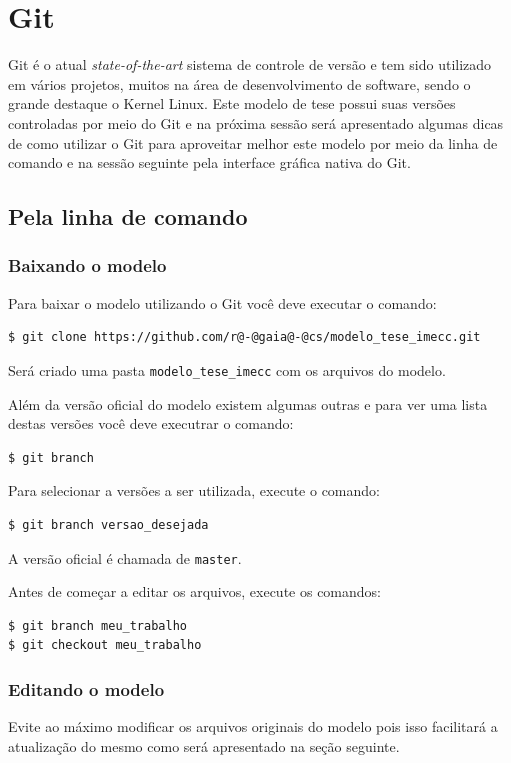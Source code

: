 \chapter{Git}
Git é o atual \textit{state-of-the-art} sistema de controle de versão e tem sido
utilizado em vários projetos, muitos na área de desenvolvimento de software,
sendo o grande destaque o Kernel Linux. Este modelo de tese possui suas versões
controladas por meio do Git e na próxima sessão será apresentado algumas
dicas de como utilizar o Git para aproveitar melhor este modelo por meio da
linha de comando e na sessão seguinte pela interface gráfica nativa do Git.

\section{Pela linha de comando}
\subsection{Baixando o modelo}
Para baixar o modelo utilizando o Git você deve executar o comando:
\begin{lstlisting}[escapechar=@]
$ git clone https://github.com/r@-@gaia@-@cs/modelo_tese_imecc.git
\end{lstlisting}
Será criado uma pasta \lstinline+modelo_tese_imecc+ com os arquivos do
modelo.

Além da versão oficial do modelo existem algumas outras e para ver uma lista
destas versões você deve executrar o comando:
\begin{lstlisting}
$ git branch
\end{lstlisting}
Para selecionar a versões a ser utilizada, execute o comando:
\begin{lstlisting}
$ git branch versao_desejada
\end{lstlisting}
A versão oficial é chamada de \lstinline+master+.

Antes de começar a editar os arquivos, execute os comandos:
\begin{lstlisting}
$ git branch meu_trabalho
$ git checkout meu_trabalho
\end{lstlisting}

\subsection{Editando o modelo}
Evite ao máximo modificar os arquivos originais do modelo pois isso facilitará a
atualização do mesmo como será apresentado na seção seguinte.

